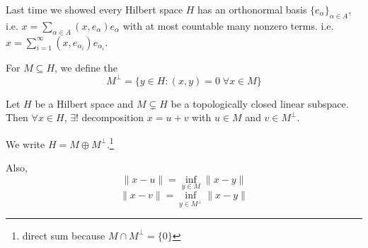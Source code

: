 Last time we showed every Hilbert space $H$ has an orthonormal basis $\{e_\alpha\}_{\alpha \in A}$,
i.e. $x = \sum_{\alpha \in A} (x, e_\alpha)e_\alpha$ with at most countable many nonzero terms.
i.e. $x = \sum_{i =1}^\infty (x, e_{\alpha_i}) e_{\alpha_i}$.

\begin{defn}
    For $M \subseteq H$, we define the  
    \[
        M^{\perp} = \{ y \in H : (x, y) = 0 \; \forall x \in M \}
    \]  
\end{defn}

\begin{prop}
    Let $H$ be a Hilbert space and $M \subsetneq H$ be a topologically closed linear subspace.
    Then $\forall x \in H$, $\exists !$ decomposition $x = u + v$ with $u \in M$ and $v \in M^{\perp}$.
    
    We write $H = M \oplus M^{\perp}$.\footnote{direct sum because $M \cap M^{\perp} = \{0\}$}

    Also, 
    \[
        \| x - u \| = \inf_{y \in M} \| x - y \|  
    \] 
    \[
        \| x - v \| = \inf_{y \in M^{\perp}} \| x - y \|  
    \] 
\end{prop}
